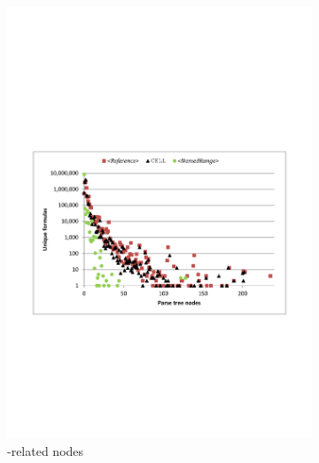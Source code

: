 \documentclass[times]{smrauth}
\begin{document}
\begin{figure}
	\centering
	\begin{subfigure}[b]{0.49\textwidth}
		\centering
		\includegraphics[width=1\textwidth]{img/nodesReference}
		\caption{-related nodes}
		\label{fig:nodesReference}
	\end{subfigure}
	~
	\begin{subfigure}[b]{0.49\textwidth}
		\centering

\end{subfigure}
\end{figure}
\end{document}
